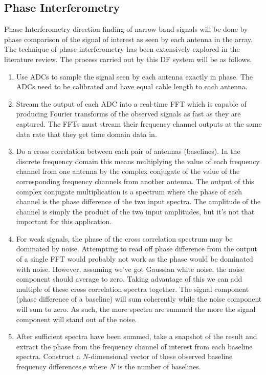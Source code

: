 \subsection{Phase Interferometry}
Phase Interferometry direction finding of narrow band signals will be done by phase comparison of the signal of interest as seen by each antenna in the array. The technique of phase interferometry has been extensively explored in the literature review. The process carried out by this DF system will be as follows.
\begin{enumerate}
  \item Use ADCs to sample the signal seen by each antenna exactly in phase. The ADCs need to be calibrated and have equal cable length to each antenna.
  \item Stream the output of each ADC into a real-time FFT which is capable of producing Fourier transforms of the observed signals as fast as they are captured. The FFTs must stream their frequency channel outputs at the same data rate that they get time domain data in.
  \item Do a cross correlation between each pair of antennas (baselines). In the discrete frequency domain this means multiplying the value of each frequency channel from one antenna by the complex conjugate of the value of the corresponding frequency channels from another antenna. The output of this complex conjugate multiplication is a spectrum where the phase of each channel is the phase difference of the two input spectra. The amplitude of the channel is simply the product of the two input amplitudes, but it's not that important for this application.
  \item For weak signals, the phase of the cross correlation spectrum may be dominated by noise. Attempting to read off phase difference from the output of a single FFT would probably not work as the phase would be dominated with noise. However, assuming we've got Gaussian white noise, the noise component should average to zero. Taking advantage of this we can add multiple of these cross correlation spectra together. The signal component (phase difference of a baseline) will sum coherently while the noise component will sum to zero. As such, the more spectra are summed the more the signal component will stand out of the noise.
  \item After sufficient spectra have been summed, take a snapshot of the result and extract the phase from the frequency channel of interest from each baseline spectra. Construct a \(N\)-dimensional vector of these observed baseline frequency differences,e where \(N\) is the number of baselines.

\end{enumerate}
